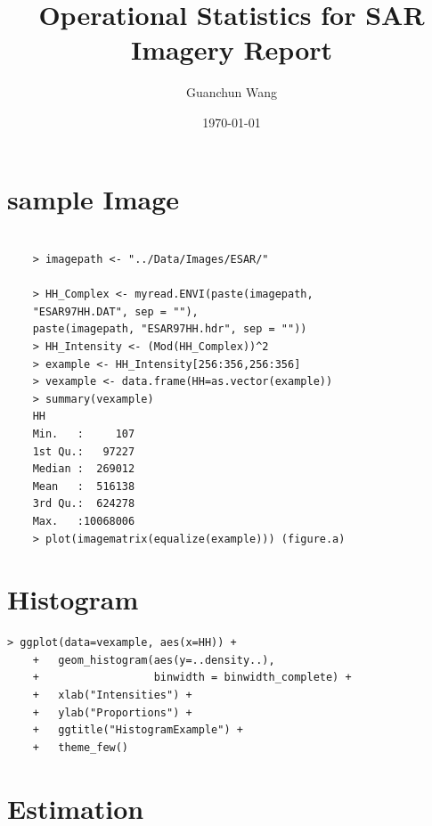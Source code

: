 \documentclass{article}
\title{Operational Statistics for SAR Imagery Report}
\author{Guanchun Wang}
\date\today
\begin{document}
	\maketitle
	
	\section{sample Image}
	\begin{lstlisting}[frame=tb]
	
	> imagepath <- "../Data/Images/ESAR/"
	
	> HH_Complex <- myread.ENVI(paste(imagepath,
	"ESAR97HH.DAT", sep = ""),
	paste(imagepath, "ESAR97HH.hdr", sep = ""))
	> HH_Intensity <- (Mod(HH_Complex))^2
	> example <- HH_Intensity[256:356,256:356]
	> vexample <- data.frame(HH=as.vector(example))
	> summary(vexample)
	HH
	Min.   :     107
	1st Qu.:   97227
	Median :  269012
	Mean   :  516138
	3rd Qu.:  624278
	Max.   :10068006
	> plot(imagematrix(equalize(example))) (figure.a)
	\end{lstlisting}
	\begin{figure}[htbp]
		\centering
		\quad
		\quad
	\end{figure}
	
	\section{Histogram}
	\begin{lstlisting}[frame=tb]
	> ggplot(data=vexample, aes(x=HH)) +
	+   geom_histogram(aes(y=..density..),
	+                  binwidth = binwidth_complete) +
	+   xlab("Intensities") +
	+   ylab("Proportions") +
	+   ggtitle("HistogramExample") +
	+   theme_few()
	\end{lstlisting}
	
	\section{Estimation}
\end{document}
